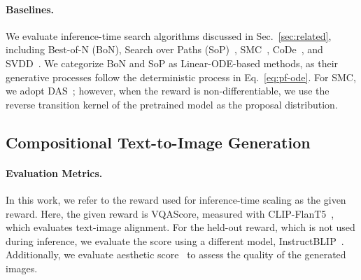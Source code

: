 \paragraph{Baselines.} We evaluate inference-time search algorithms discussed in Sec.~\ref{sec:related}, including Best-of-N (BoN), Search over Paths (SoP)~\cite{Ma2025:SoP}, SMC~\cite{Kim:2025DAS}, CoDe~\cite{Singh:2025CoDE}, and SVDD~\cite{Li2024:SVDD}. 
We categorize BoN and SoP as Linear-ODE-based methods, as their generative processes follow the deterministic process in Eq.~\ref{eq:pf-ode}. 
For SMC, we adopt DAS~\cite{Kim:2025DAS}; however, when the reward is non-differentiable, we use the reverse transition kernel of the pretrained model as the proposal distribution. 





% 

\vspace{-0.3\baselineskip}
\subsection{Compositional Text-to-Image Generation}
\vspace{-0.3\baselineskip}
\label{sec:compositional_generation}
\paragraph{Evaluation Metrics.} 
In this work, we refer to the reward used for inference-time scaling as the given reward. 
Here, the given reward is VQAScore, measured with CLIP-FlanT5~\cite{Lin:2024CLIPFlanT5}, which evaluates text-image alignment. 
For the held-out reward, which is not used during inference, we evaluate the score using a different model, InstructBLIP~\cite{Dai:2023InstructBLIP}. 
Additionally, we evaluate aesthetic score~\cite{Schuhmann:aesthetics} to assess the quality of the generated images. 

\vspace{-0.5\baselineskip}

